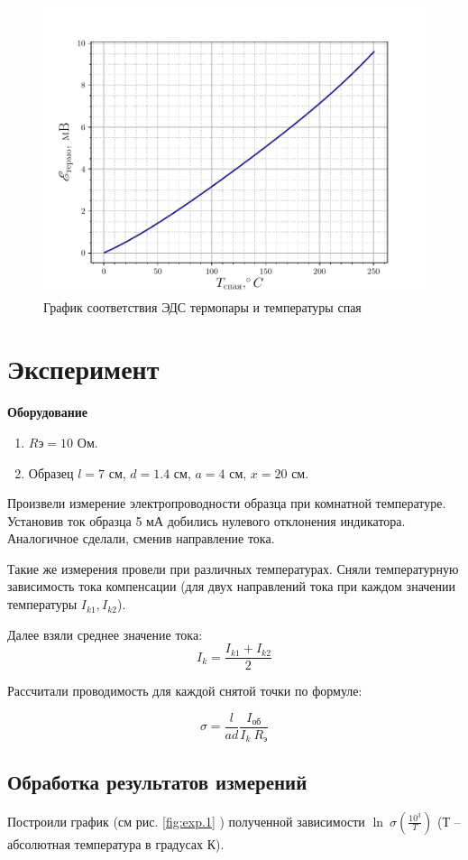 \begin{figure}[h!]
	\centering
	\includegraphics[width = .9\linewidth]{img/grad.pdf}
	\caption{График соответствия ЭДС термопары и температуры спая}
	\label{fig:6.3}
\end{figure}

\newpage
\section*{Эксперимент}
\textbf{Оборудование}
\begin{enumerate}
	\item $R{\text{э}} = 10$ Ом.
	\item Образец $l = 7$ см, $d=1.4$ см, $a = 4$ см, $x = 20$ см.
\end{enumerate}

Произвели измерение электропроводности образца при комнатной температуре. Установив ток образца 5 мА 
добились нулевого отклонения индикатора. Аналогичное сделали, сменив направление тока.

Такие же измерения провели при различных температурах. Сняли температурную зависимость тока компенсации (для двух направлений тока при каждом
значении температуры $I_{k1},I_{k2}$).

Далее взяли среднее значение тока:
$$I_k=\frac{I_{k1}+I_{k2}}{2}$$

Рассчитали проводимость для каждой снятой точки по формуле:

$$\sigma = \frac{l}{ad} \frac{I_{\text{об}}}{ I_k ~ R_{\text{э}}}$$


\subsection*{Обработка результатов измерений}
Построили график (см рис. \ref{fig:exp.1} ) полученной зависимости $\ln~\sigma(\frac{10^3}{T})$ (Т – абсолютная температура в градусах К).

